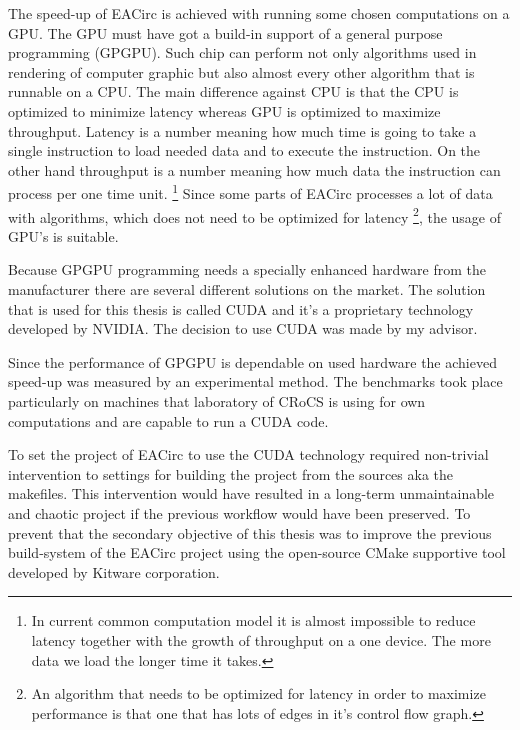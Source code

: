 \documentclass[12pt,oneside]{fithesis2}
\begin{document}
The speed-up of EACirc is achieved with running some chosen computations on a GPU. The GPU must have got a build-in support of a general purpose programming (GPGPU). Such chip can perform not only algorithms used in rendering of computer graphic but also almost every other algorithm that is runnable on a CPU. The main difference against CPU is that the CPU is optimized to minimize latency whereas GPU is optimized to maximize throughput. Latency is a number meaning how much time is going to take a single instruction to load needed data and to execute the instruction. On the other hand throughput is a number meaning how much data the instruction can process per one time unit. \footnote{In current common computation model it is almost impossible to reduce latency together with the growth of throughput on a one device. The more data we load the longer time it takes.} Since some parts of EACirc processes a lot of data with algorithms, which does not need to be optimized for latency \footnote{An algorithm that needs to be optimized for latency in order to maximize performance is that one that has lots of edges in it's control flow graph.}, the usage of GPU's is suitable.

Because GPGPU programming needs a specially enhanced hardware from the manufacturer there are several different solutions on the market. The solution that is used for this thesis is called CUDA \cite{about_cuda} and it's a proprietary technology developed by NVIDIA. \cite{nvidia} The decision to use CUDA was made by my advisor.

Since the performance of GPGPU is dependable on used hardware the achieved speed-up was measured by an experimental method. The benchmarks took place particularly on machines that laboratory of CRoCS is using for own computations and are capable to run a CUDA code.

\medskip

To set the project of EACirc to use the CUDA technology required non-trivial intervention to settings for building the project from the sources aka the makefiles. This intervention would have resulted in a long-term unmaintainable and chaotic project if the previous workflow would have been preserved.  To prevent that the secondary objective of this thesis was to improve the previous build-system of the EACirc project using the open-source CMake \cite{cmake} supportive tool developed by Kitware \cite{kitware} corporation.
\end{document}
